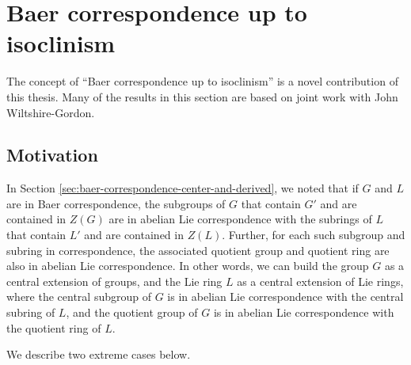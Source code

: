 
\section{Baer correspondence up to isoclinism}\label{sec:bcuti}

The concept of ``Baer correspondence up to isoclinism'' is a novel
contribution of this thesis. Many of the results in this section are
based on joint work with John Wiltshire-Gordon.

\subsection{Motivation}

In Section \ref{sec:baer-correspondence-center-and-derived}, we noted
that if $G$ and $L$ are in Baer correspondence, the subgroups of $G$
that contain $G'$ and are contained in $Z(G)$ are in abelian Lie
correspondence with the subrings of $L$ that contain $L'$ and are
contained in $Z(L)$. Further, for each such subgroup and subring in
correspondence, the associated quotient group and quotient ring are
also in abelian Lie correspondence. In other words, we can build the
group $G$ as a central extension of groups, and the Lie ring $L$ as a
central extension of Lie rings, where the central subgroup of $G$ is
in abelian Lie correspondence with the central subring of $L$, and the
quotient group of $G$ is in abelian Lie correspondence with the
quotient ring of $L$.

We describe two extreme cases below.

